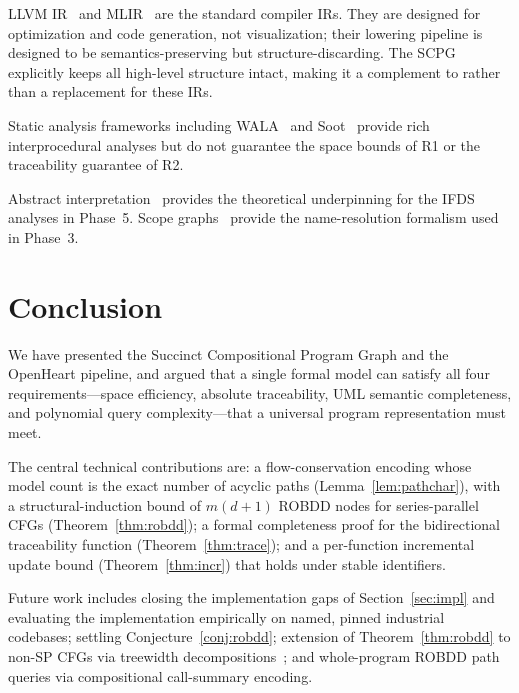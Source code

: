 \documentclass[journal,10pt,twoside]{IEEEtran}
\begin{document}
LLVM IR~\cite{lattner04} and MLIR~\cite{lattner21} are the
standard compiler IRs.  They are designed for optimization
and code generation, not visualization; their lowering
pipeline is designed to be semantics-preserving but
structure-discarding.  The SCPG explicitly keeps all
high-level structure intact, making it a complement to
rather than a replacement for these IRs.

Static analysis frameworks including WALA~\cite{wala} and
Soot~\cite{lhotak03} provide rich interprocedural analyses
but do not guarantee the space bounds of R1 or the
traceability guarantee of R2.

Abstract interpretation~\cite{cousotcousot77} provides the
theoretical underpinning for the IFDS analyses in Phase~5.
Scope graphs~\cite{antwerpen16} provide the name-resolution
formalism used in Phase~3.

\section{Conclusion}\label{sec:concl}

We have presented the Succinct Compositional Program Graph
and the OpenHeart pipeline, and argued that a single formal
model can satisfy all four requirements---space efficiency,
absolute traceability, UML semantic completeness, and
polynomial query complexity---that a universal program
representation must meet.

The central technical contributions are: a flow-conservation
encoding whose model count is the exact number of acyclic
paths (Lemma~\ref{lem:pathchar}), with a structural-induction
bound of $m(d+1)$ ROBDD nodes for series-parallel CFGs
(Theorem~\ref{thm:robdd}); a formal completeness proof for the
bidirectional traceability function (Theorem~\ref{thm:trace});
and a per-function incremental update bound
(Theorem~\ref{thm:incr}) that holds under stable identifiers.

Future work includes closing the implementation gaps of
Section~\ref{sec:impl} and evaluating the implementation
empirically on named, pinned industrial codebases; settling
Conjecture~\ref{conj:robdd}; extension of
Theorem~\ref{thm:robdd} to non-SP CFGs via treewidth
decompositions~\cite{bodlaender98}; and whole-program
ROBDD path queries via compositional call-summary encoding.



\end{document}
